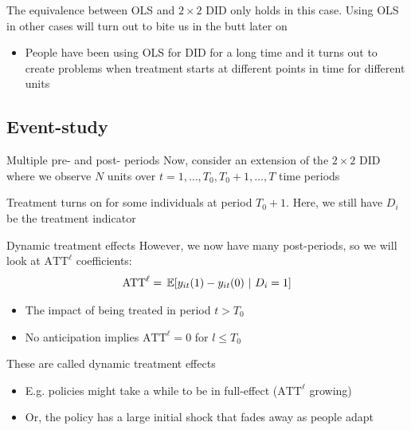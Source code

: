 \documentclass[aspectratio=169,t,11pt,table]{beamer}
\begin{document}
\begin{frame}{}
  The equivalence between OLS and $2 \times 2$ DID only holds in this case. 
  Using OLS in other cases will turn out to bite us in the butt later on
  \begin{itemize}
    \item People have been using OLS for DID for a long time and it turns out to create problems when treatment starts at different points in time for different units
  \end{itemize}
\end{frame}

\subsection{Event-study}

\begin{frame}{Multiple pre- and post- periods}
  Now, consider an extension of the $2 \times 2$ DID where we observe $N$ units over $t = 1, \dots, T_0, T_0 + 1, \dots, T$ time periods
  
  \bigskip
  Treatment turns on for some individuals at period $T_0 + 1$. Here, we still have $D_i$ be the treatment indicator
\end{frame}

\begin{frame}{Dynamic treatment effects}
  However, we now have many post-periods, so we will look at $\text{ATT}^\ell$ coefficients:
  $$
    \text{ATT}^\ell = \expec{ y_{it}(1) - y_{it}(0) }{D_i = 1}
  $$  

  \begin{itemize}
    \item The impact of being treated in period $t > T_0$
    
    \item No anticipation implies $\text{ATT}^\ell = 0$ for $l \leq T_0$
  \end{itemize}

  \pause
  \bigskip
  These are called \alert{dynamic treatment effects}
  \begin{itemize}
    \item E.g. policies might take a while to be in full-effect ($\text{ATT}^\ell$ growing)
    
    \item Or, the policy has a large initial shock that fades away as people adapt
  \end{itemize}
\end{frame}
\end{document}
